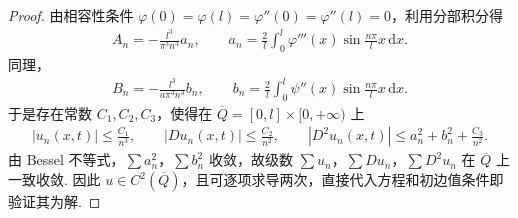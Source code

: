 \documentclass[../../main.tex]{subfiles}%
\begin{document}
\begin{proof}
由相容性条件 $\varphi(0)=\varphi(l)=\varphi''(0)=\varphi''(l)=0$，利用分部积分得
\begin{align*}
A_n=-\frac{l^3}{\pi^3n^3}a_n,\qquad a_n=\frac{2}{l}\int_0^l\varphi'''(x)\sin\frac{n\pi}{l}x\,\mathrm{d}x.
\end{align*}
同理，
\begin{align*}
B_n=-\frac{l^3}{a\pi^3n^3}b_n,\qquad b_n=\frac{2}{l}\int_0^l\psi''(x)\sin\frac{n\pi}{l}x\,\mathrm{d}x.
\end{align*}
于是存在常数 $C_1,C_2,C_3$，使得在 $\overline{Q}=[0,l]\times[0,+\infty)$ 上
\begin{align*}
|u_n(x,t)|\leqslant \frac{C_1}{n^3},\qquad |Du_n(x,t)|\leqslant \frac{C_2}{n^2},\qquad |D^2u_n(x,t)|\leqslant a_n^2+b_n^2+\frac{C_3}{n^2}.
\end{align*}
由 Bessel 不等式，$\sum a_n^2$，$\sum b_n^2$ 收敛，故级数 $\sum u_n$，$\sum Du_n$，$\sum D^2u_n$ 在 $\overline{Q}$ 上一致收敛. 因此 $u\in C^2(\overline{Q})$，且可逐项求导两次，直接代入方程和初边值条件即验证其为解.
\end{proof}
\end{document}
